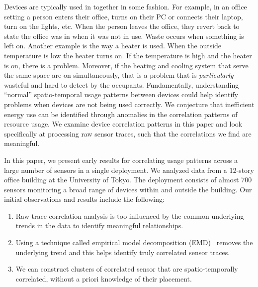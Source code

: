 Devices are typically used in together in some fashion.  For example, in an office
setting a person enters their office, turns on their PC or connects their laptop, turn on the lights, etc.
When the person leaves the office, they revert back to state the office was in when it was
not in use.  Waste occurs when something is left on.  Another example is the way a heater is used.  
When the outside temperature is low the heater turns on.  If the temperature is high and the heater is on, there
is a problem.  Moreover, if the heating and cooling system that serve the same space are on simultaneously, that
is a problem that is \emph{particularly} wasteful and hard to detect by the occupants.  
Fundamentally, understanding ``normal'' spatio-temporal usage patterns between devices could help
identify problems when devices are not being used correctly. %
We conjecture that inefficient energy use can be identified through anomalies in the correlation
patterns of resource usage.  We examine device correlation patterns in this paper and look specifically
at processing raw sensor traces, such that the correlations we find are meaningful.


 

In this paper, we present early results for correlating usage patterns across a large number of sensors
in a single deployment.  We analyzed data from a 12-story office building at the University of Tokyo.  
The deployment consists of almost 700 sensors monitoring a broad range of devices within and outside 
the building.  Our initial observations and results include the following:

\begin{enumerate}
\item Raw-trace correlation analysis is too influenced by the common underlying trends in the data
	to identify meaningful relationships.
\item Using a technique called empirical model decomposition (EMD)~\cite{huang:emd1998} removes the 
		underlying trend and this helps identify truly correlated sensor traces.
\item We can construct clusters of correlated sensor that are spatio-temporally correlated, without
		a priori knowledge of their placement.
\end{enumerate}

